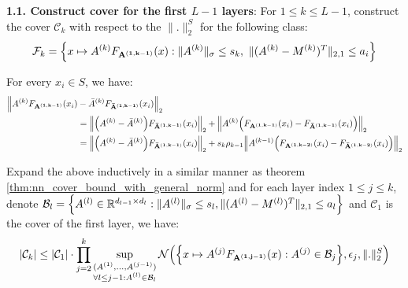 \noindent\newline\textbf{1.1. Construct cover for the first $L-1$ layers}: For $1\le k \le L-1$, construct the cover $\mathcal{C}_k$ with respect to the $\|.\|_2^S$ for the following class:
\begin{align*}
    \mathcal{F}_k = \Big\{ 
        x\mapsto A^{(k)}F_{\bf A^{(1, k-1)}}(x) : \|A^{(k)}\|_\sigma \le s_k, \ \|(A^{(k)} - M^{(k)})^T\|_{2, 1}\le a_i 
     \Big\}
\end{align*}

\noindent For every $x_i\in S$, we have:
\begin{align*}
    \Big\|A^{(k)}F_{\bf A^{(1, k-1)}}(x_i) &- {\bar A}^{(k)}F_{\bf {\bar A}^{(1, k-1)}}(x_i)\Big\|_2 \\
        &= \Big\|
            \Big( A^{(k)} - {\bar A}^{(k)} \Big)F_{\bf {\bar A}^{(1, k-1)}}(x_i)
        \Big\|_2 + \Big\|
            A^{(k)}\Big( F_{\bf A^{(1, k-1)}}(x_i) - F_{\bf {\bar A}^{(1, k-1)}}(x_i) \Big)
        \Big\|_2 \\
        &= \Big\|
            \Big( A^{(k)} - {\bar A}^{(k)} \Big)F_{\bf {\bar A}^{(1, k-1)}}(x_i)
        \Big\|_2 + s_k\rho_{k-1}\Big\|
            A^{(k-1)}\Big( F_{\bf A^{(1, k-2)}}(x_i) - F_{\bf {\bar A}^{(1, k-2)}}(x_i) \Big)
        \Big\|_2 \\
\end{align*}

\noindent Expand the above inductively in a similar manner as theorem \ref{thm:nn_cover_bound_with_general_norm} and for each layer index $1\le j\le k$, denote $\mathcal{B}_l=\Big\{ A^{(l)}\in\mathbb{R}^{d_{l-1}\times d_l} : \|A^{(l)}\|_\sigma\le s_l, \|(A^{(l)}-M^{(l)})^T\|_{2, 1} \le a_l \Big\}$ and $\mathcal{C}_1$ is the cover of the first layer, we have:
\begin{align*}
    |\mathcal{C}_k| \le |\mathcal{C}_1| \cdot \prod_{j=2}^k \sup_{ 
        \substack{
            (A^{(1)}, \dots, A^{(j-1)}) \\
            \forall l \le j-1:A^{(l)}\in\mathcal{B}_l
        } 
    } \mathcal{N}\Big( 
        \Big\{ 
            x\mapsto A^{(j)}F_{\bf A^{(1, j-1)}}(x) : A^{(j)}\in\mathcal{B}_j
         \Big\}, \epsilon_j, \|.\|_2^S 
     \Big)
\end{align*}

